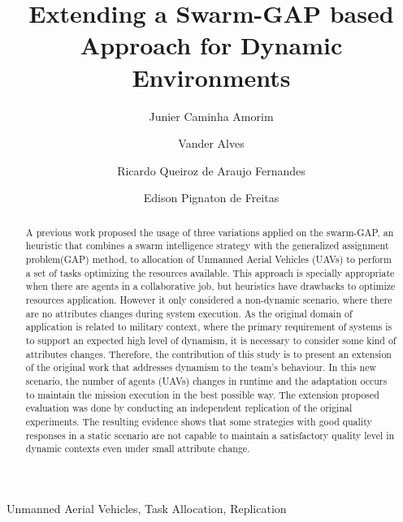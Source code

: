 \documentclass[review]{elsarticle}
\newcommand{\uavs}{UAVs}
\begin{document}
\begin{frontmatter}
	
\title{Extending a Swarm-GAP based Approach for Dynamic Environments}

\author[unbaddress]{Junier Caminha Amorim}

\author[unbaddress]{Vander Alves}

\author[brazilianarmyaddress]{Ricardo Queiroz de Araujo Fernandes}

\author[ufrgsaddress]{Edison Pignaton de Freitas}

\address[unbaddress]{Computation Science Department University of Brasilia, Brazil}
\address[ufrgsaddress]{Institute of Informatics Federal University of Rio Grande do Sul, Brazil}
\address[brazilianarmyaddress]{Software Development Center - Brazilian Army, Brazil}

\begin{abstract}
A previous work proposed the usage of three variations applied on the swarm-GAP, an heuristic that combines a swarm intelligence strategy with the generalized assignment problem(GAP) method, to allocation of Unmanned Aerial Vehicles (\uavs) to perform a set of tasks optimizing the resources available. This approach is specially appropriate when there are agents in a collaborative job, but heuristics have drawbacks to optimize resources application. However it only considered a non-dynamic scenario, where there are no attributes changes during system execution. As the original domain of application is related to military context, where the primary requirement of systems is to support an expected high level of dynamism, it is necessary to consider some kind of attributes changes. Therefore, the contribution of this study is to present an extension of the original work that addresses dynamism to the team's behaviour. In this new scenario, the number of agents (\uavs) changes in runtime and the adaptation occurs to maintain the mission execution in the best possible way. The extension proposed evaluation was done by conducting an independent replication of the original experiments. The resulting evidence shows that some strategies with good quality responses in a static scenario are not capable to maintain a satisfactory quality level in dynamic contexts even under small attribute change. 
\end{abstract}

\begin{keyword}
Unmanned Aerial Vehicles, Task Allocation, Replication
\end{keyword}

\end{frontmatter}
\end{document}
